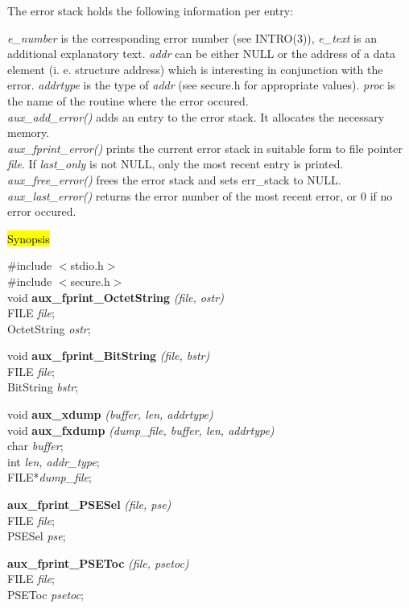 The error stack holds the following information per entry:

{\em e\_number} is the corresponding error number (see INTRO(3)), {\em e\_text} is an additional
explanatory text. {\em addr} can be either NULL or the address of a data element (i. e. 
structure address) which is interesting in conjunction with the error. {\em addrtype} is the
type of {\em addr} (see secure.h for appropriate values). {\em proc} is the name of the 
routine where the error occured.
\\ [1em]
{\em aux\_add\_error()} adds an entry to the error stack. It allocates the necessary memory.
\\ [1em]
{\em aux\_fprint\_error()} prints the current error stack in suitable form to file pointer {\em file}.
If {\em last\_only} is not NULL, only the most recent entry is printed.
\\ [1em]
{\em aux\_free\_error()} frees the error stack and sets err\_stack to NULL.
\\ [1em]
{\em aux\_last\_error()} returns the error number of the most recent error, or 0 if
no error occured.

\label{aux_printostring}
\hl{Synopsis}

\#include $<$stdio.h$>$ \\
\#include $<$secure.h$>$ \\ [1em]
void {\bf aux\_fprint\_OctetString} {\em (file, ostr)} \\
FILE {\em *file}; \\
OctetString {\em *ostr};

void {\bf aux\_fprint\_BitString} {\em (file, bstr)} \\
FILE {\em *file}; \\
BitString {\em *bstr};

void {\bf aux\_xdump} {\em (buffer, len, addrtype)}  \\
void {\bf aux\_fxdump} {\em (dump\_file, buffer, len, addrtype)}  \\
char {\em *buffer}; \\
int  {\em len, addr\_type}; \\
FILE*{\em dump\_file};

{\bf aux\_fprint\_PSESel} {\em (file, pse)} \\
FILE {\em *file}; \\
PSESel {\em *pse};

{\bf aux\_fprint\_PSEToc} {\em (file, psetoc)} \\
FILE {\em *file}; \\
PSEToc {\em *psetoc};

